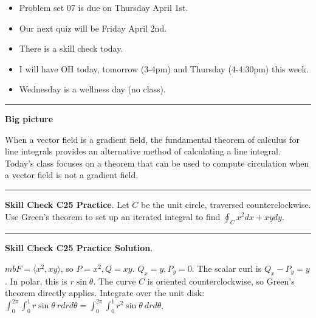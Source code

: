 \documentclass[12pt,letterpaper,noanswers]{exam}
\begin{document}
 \pdfpageheight 11in 
  \pdfpagewidth 8.5in


\begin{itemize}
\itemsep0em
    \item Problem set 07 is due on Thursday April 1st.
    \item Our next quiz will be Friday April 2nd.
    \item There is a skill check today.
    \item I will have OH today, tomorrow (3-4pm) and Thursday (4-4:30pm) this week.
    \item Wednesday is a wellness day (no class).
\end{itemize}

\hrule
\vspace{0.2cm}


\noindent\textbf{Big picture}

When a vector field is a gradient field, the fundamental theorem of calculus for line integrals provides an alternative method of calculating a line integral.  Today's class focuses on a theorem that can be used to compute circulation when a vector field is not a gradient field.

\vspace{0.2cm}
\hrule
\vspace{0.2cm}

\noindent\textbf{Skill Check C25 Practice}.  
Let $C$ be the unit circle, traversed counterclockwise.  Use Green's theorem to set up an iterated integral to find $\displaystyle\oint_C x^2 dx + xydy$.

\vspace{0.2cm}
\hrule
\vspace{0.2cm}

\noindent\textbf{Skill Check C25 Practice Solution}.  

$mb F = \langle x^2, xy\rangle$, so $P = x^2, Q = xy$.  $Q_x = y, P_y = 0$.  The scalar curl is $Q_x - P_y = y$.  In polar, this is $r\sin\theta$.  The curve $C$ is oriented counterclockwise, so Green's theorem directly applies.  Integrate over the unit disk: $\displaystyle\int_0^{2\pi}\int_0^1 r\sin\theta\ rdrd\theta = \displaystyle\int_0^{2\pi}\int_0^1 r^2\sin\theta\ drd\theta$.
\end{document}
